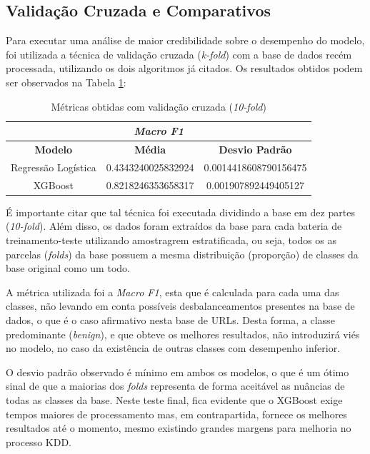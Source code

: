 \documentclass[a4paper, 12pt]{article}
\begin{document}
\subsection{Validação Cruzada e Comparativos}

Para executar uma análise de maior credibilidade sobre o desempenho do modelo, foi utilizada a técnica de validação cruzada (\emph{k-fold}) com a base de dados recém processada, utilizando os dois algoritmos já citados. Os resultados obtidos podem ser observados na Tabela \ref{tab:exampleTab2}:

\begin{table}[H]
    \centering
    \caption{Métricas obtidas com validação cruzada (\emph{10-fold})}
    \vspace{0.3cm}
    \label{tab:exampleTab2}
    \begin{tabular}{c|c|c}
        \hline
        \multicolumn{3}{c}{\textit{Macro F1}}\\
        \hline
        \textbf{Modelo} & \textbf{Média} & \textbf{Desvio Padrão}\\
        \hline
        Regressão Logística & 0.4343240025832924 & 0.0014418608790156475\\
        XGBoost & 0.8218246353658317 & 0.001907892449405127\\
    \end{tabular}
\end{table}

É importante citar que tal técnica foi executada dividindo a base em dez partes (\emph{10-fold}). Além disso, os dados foram extraídos da base para cada bateria de treinamento-teste utilizando amostragrem estratificada, ou seja, todos os as parcelas (\emph{folds}) da base possuem a mesma distribuição (proporção) de classes da base original como um todo.

A métrica utilizada foi a \emph{Macro F1}, esta que é calculada para cada uma das classes, não levando em conta possíveis desbalanceamentos presentes na base de dados, o que é o caso afirmativo nesta base de URLs. Desta forma, a classe predominante (\emph{benign}), e que obteve os melhores resultados, não introduzirá viés no modelo, no caso da existência de outras classes com desempenho inferior.

O desvio padrão observado é mínimo em ambos os modelos, o que é um ótimo sinal de que a maiorias dos \emph{folds} representa de forma aceitável as nuâncias de todas as classes da base. Neste teste final, fica evidente que o XGBoost exige tempos maiores de processamento mas, em contrapartida, fornece os melhores resultados até o momento, mesmo existindo grandes margens para melhoria no processo KDD. 
\end{document}
